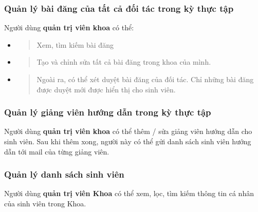 \documentclass[./../main.tex]{subfiles}
\begin{document}
\hypertarget{quux1ea3n-luxfd-buxe0i-ux111ux103ng-cux1ee7a-tux1ea5t-cux1ea3-ux111ux1ed1i-tuxe1c-trong-kux1ef3-thux1ef1c-tux1eadp}{%
	\subsubsection{Quản lý bài đăng của tất cả đối tác trong kỳ thực
		tập}\label{quux1ea3n-luxfd-buxe0i-ux111ux103ng-cux1ee7a-tux1ea5t-cux1ea3-ux111ux1ed1i-tuxe1c-trong-kux1ef3-thux1ef1c-tux1eadp}}
  
Người dùng \textbf{quản trị viên khoa} có thể:
  
\begin{itemize}
	\item
	      \begin{quote}
	      	Xem, tìm kiếm bài đăng
	      \end{quote}
	\item
	      \begin{quote}
	      	Tạo và chỉnh sửa tất cả bài đăng trong khoa của mình.
	      \end{quote}
	\item
	      \begin{quote}
	      	Ngoài ra, có thể xét duyệt bài đăng của đối tác. Chỉ những bài đăng
	      	được duyệt mới được hiển thị cho sinh viên.
	      \end{quote}
\end{itemize}
  
\hypertarget{quux1ea3n-luxfd-giux1ea3ng-viuxean-hux1b0ux1edbng-dux1eabn-trong-kux1ef3-thux1ef1c-tux1eadp}{%
	\subsubsection{Quản lý giảng viên hướng dẫn trong kỳ thực
		tập}\label{quux1ea3n-luxfd-giux1ea3ng-viuxean-hux1b0ux1edbng-dux1eabn-trong-kux1ef3-thux1ef1c-tux1eadp}}
  
Người dùng \textbf{quản trị viên khoa} có thể thêm / sửa giảng viên
hướng dẫn cho sinh viên. Sau khi thêm xong, người này có thể gửi danh
sách sinh viên hướng dẫn tới mail của từng giảng viên.
  
\hypertarget{quux1ea3n-luxfd-danh-suxe1ch-sinh-viuxean}{%
	\subsubsection{Quản lý danh sách sinh
		viên}\label{quux1ea3n-luxfd-danh-suxe1ch-sinh-viuxean}}
  
Người dùng \textbf{quản trị viên Khoa} có thể xem, lọc, tìm kiếm thông
tin cá nhân của sinh viên trong Khoa.
  
\end{document}
